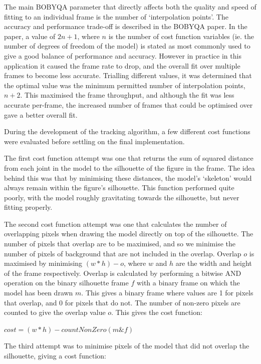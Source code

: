 The main BOBYQA parameter that directly affects both the quality and speed of fitting to an individual frame is the number of `interpolation points'. The accuracy and performance trade-off is described in the BOBYQA paper\cite{bobyqa}. In the paper, a value of $2n + 1$, where $n$ is the number of cost function variables (ie. the number of degrees of freedom of the model) is stated as most commonly used to give a good balance of performance and accuracy. However in practice in this application it caused the frame rate to drop, and the overall fit over multiple frames to become less accurate. Trialling different values, it was determined that the optimal value was the minimum permitted number of interpolation points, $n + 2$. This maximised the frame throughput, and although the fit was less accurate per-frame, the increased number of frames that could be optimised over gave a better overall fit.

During the development of the tracking algorithm, a few different cost functions were evaluated before settling on the final implementation.

The first cost function attempt was one that returns the sum of squared distance from each joint in the model to the silhouette of the figure in the frame. The idea behind this was that by minimising these distances, the model's `skeleton' would always remain within the figure's silhouette. This function performed quite poorly, with the model roughly gravitating towards the silhouette, but never fitting properly.

The second cost function attempt was one that calculates the number of overlapping pixels when drawing the model directly on top of the silhouette. The number of pixels that overlap are to be maximised, and so we minimise the number of pixels of background that are not included in the overlap. Overlap $o$ is maximised by minimising $(w * h) - o$, where $w$ and $h$ are the width and height of the frame respectively. Overlap is calculated by performing a bitwise AND operation on the binary silhouette frame $f$ with a binary frame on which the model has been drawn $m$. This gives a binary frame where values are 1 for pixels that overlap, and 0 for pixels that do not. The number of non-zero pixels are counted to give the overlap value $o$. This gives the cost function:

\centerline{$cost = (w * h) - countNonZero(m \& f)$}

The third attempt was to minimise pixels of the model that did not overlap the silhouette, giving a cost function:


